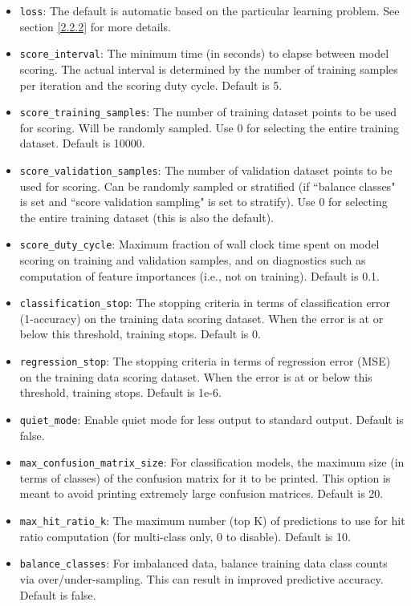 \documentclass[11pt]{article}
\begin{document}
\begin{itemize}
\item \texttt{loss}: The default is automatic based on the particular learning problem. See section \ref{2.2.2} for more details.
\item \texttt{score\_interval}: The minimum time (in seconds) to elapse between model scoring. The actual interval is determined by the number of training samples per iteration and the scoring duty cycle. Default is 5.
\item \texttt{score\_training\_samples}: The number of training dataset points to be used for scoring. Will be randomly sampled. Use 0 for selecting the entire training dataset. Default is 10000.
\item \texttt{score\_validation\_samples}: The number of validation dataset points to be used for scoring. Can be randomly sampled or stratified (if ``balance classes" is set and ``score validation sampling" is set to stratify). Use 0 for selecting the entire training dataset (this is also the default).
\item \texttt{score\_duty\_cycle}: Maximum fraction of wall clock time spent on model scoring on training and validation samples, and on diagnostics such as computation of feature importances (i.e., not on training). Default is 0.1.
\item \texttt{classification\_stop}: The stopping criteria in terms of classification error (1-accuracy) on the training data scoring dataset. When the error is at or below this threshold, training stops. Default is 0.
\item \texttt{regression\_stop}: The stopping criteria in terms of regression error (MSE) on the training data scoring dataset. When the error is at or below this threshold, training stops. Default is 1e-6.
\item \texttt{quiet\_mode}: Enable quiet mode for less output to standard output. Default is false.
\item \texttt{max\_confusion\_matrix\_size}: For classification models, the maximum size (in terms of classes) of the confusion matrix for it to be printed. This option is meant to avoid printing extremely large confusion matrices. Default is 20.
\item \texttt{max\_hit\_ratio\_k}: The maximum number (top K) of predictions to use for hit ratio computation (for multi-class only, 0 to disable). Default is 10.
\item \texttt{balance\_classes}: For imbalanced data, balance training data class counts via over/under-sampling. This can result in improved predictive accuracy. Default is false.

\end{itemize}
\end{document}
